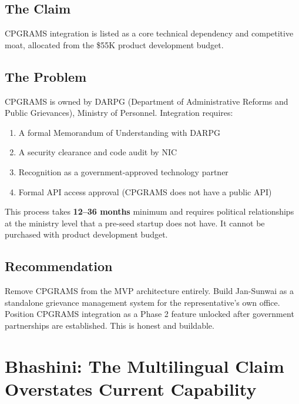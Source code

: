 \documentclass[12pt, a4paper]{article}
\begin{document}
\subsection{The Claim}
CPGRAMS integration is listed as a core technical dependency and competitive moat, allocated from the \$55K product development budget.

\subsection{The Problem}

CPGRAMS is owned by DARPG (Department of Administrative Reforms and Public Grievances), Ministry of Personnel. Integration requires:

\begin{enumerate}[leftmargin=1.5em]
    \item A formal Memorandum of Understanding with DARPG
    \item A security clearance and code audit by NIC
    \item Recognition as a government-approved technology partner
    \item Formal API access approval (CPGRAMS does not have a public API)
\end{enumerate}

This process takes \textbf{12--36 months} minimum and requires political relationships at the ministry level that a pre-seed startup does not have. It cannot be purchased with product development budget.

\subsection{Recommendation}
Remove CPGRAMS from the MVP architecture entirely. Build Jan-Sunwai as a standalone grievance management system for the representative's own office. Position CPGRAMS integration as a Phase 2 feature unlocked after government partnerships are established. This is honest and buildable.

\newpage

\section{Bhashini: The Multilingual Claim Overstates Current Capability}
\end{document}

